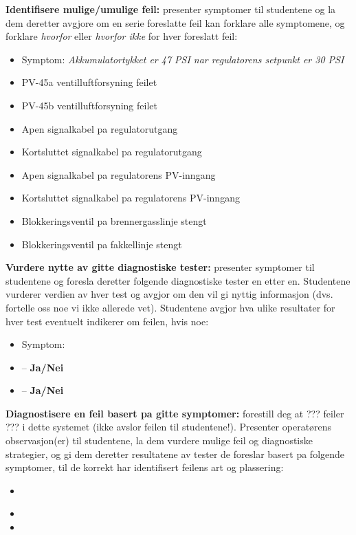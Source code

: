 \noindent
{\bf Identifisere mulige/umulige feil:} presenter symptomer til studentene og la dem deretter avgjore om en serie foreslatte feil kan forklare alle symptomene, og forklare {\it hvorfor} eller {\it hvorfor ikke} for hver foreslatt feil:

\begin{itemize}
\item{} Symptom: {\it Akkumulatortykket er 47 PSI nar regulatorens setpunkt er 30 PSI}
\item{} PV-45a ventilluftforsyning feilet
\item{} PV-45b ventilluftforsyning feilet
\item{} Apen signalkabel pa regulatorutgang
\item{} Kortsluttet signalkabel pa regulatorutgang
\item{} Apen signalkabel pa regulatorens PV-inngang
\item{} Kortsluttet signalkabel pa regulatorens PV-inngang
\item{} Blokkeringsventil pa brennergasslinje stengt
\item{} Blokkeringsventil pa fakkellinje stengt
\end{itemize}


\vskip 10pt


\noindent
{\bf Vurdere nytte av gitte diagnostiske tester:} presenter symptomer til studentene og foresla deretter folgende diagnostiske tester en etter en.  Studentene vurderer verdien av hver test og avgjor om den vil gi nyttig informasjon (dvs. fortelle oss noe vi ikke allerede vet).  Studentene avgjor hva ulike resultater for hver test eventuelt indikerer om feilen, hvis noe:

\begin{itemize}
\item{} Symptom: {\it }
\item{}  -- {\bf Ja/Nei}
\item{}  -- {\bf Ja/Nei}
\end{itemize}


\vskip 10pt


\noindent
{\bf Diagnostisere en feil basert pa gitte symptomer:} forestill deg at ??? feiler ??? i dette systemet (ikke avslor feilen til studentene!).  Presenter operatørens observasjon(er) til studentene, la dem vurdere mulige feil og diagnostiske strategier, og gi dem deretter resultatene av tester de foreslar basert pa folgende symptomer, til de korrekt har identifisert feilens art og plassering:

\begin{itemize}
\item{} {\it }
\item{} 
\item{} 
\end{itemize}





